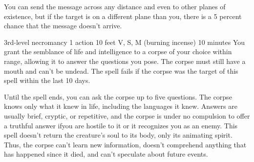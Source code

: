\documentclass[10pt,twoside,twocolumn,openany]{book}
\begin{document}
You can send the message across any distance and even to other planes of existence, but if the target is on a different plane than you, there is a 5 percent chance that the message doesn't arrive.

{3rd-level necromancy}
{\color{action} 1 action}
{10 feet}
{V, S, M (burning incense)}
{10 minutes}
You grant the semblance of life and intelligence to a corpse of your choice within range, allowing it to answer the questions you pose. The corpse must still have a mouth and can't be undead. The spell fails if the corpse was the target of this spell within the last 10 days.

Until the spell ends, you can ask the corpse up to five questions. The corpse knows only what it knew in life, including the languages it knew. Answers are usually brief, cryptic, or repetitive, and the corpse is under no compulsion to offer a truthful answer ifyou are hostile to it or it recognizes you as an enemy. This spell doesn't return the creature's soul to its body, only its animating spirit. Thus, the corpse can't learn new information, doesn't comprehend anything that has happened since it died, and can't speculate about future events.

%
%
\end{document}
